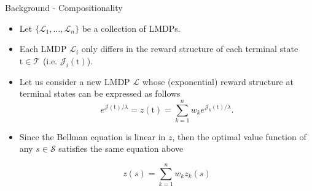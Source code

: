 \documentclass{beamer}
\theoremstyle{mystyle}
\newcommand{\tS}{\text{t}}   %
\newcommand{\cJ}{\mathcal{J}}
\newcommand{\cL}{\mathcal{L}}
\newcommand{\cS}{\mathcal{S}}
\newcommand{\cT}{\mathcal{T}}
\begin{document}
\begin{frame}{Background - Compositionality}
    \begin{itemize}
    \item Let $\{\cL_1,\ldots,\cL_n\}$ be a collection of LMDPs. 
   
    \item Each LMDP $\cL_i$ only differs in the reward structure of each terminal state $\tS\in\cT$ (i.e. $\cJ_i(\tS)$).
    
    \item Let us consider a new LMDP $\cL$ whose (exponential) reward structure at terminal states can be expressed as follows~\cite{TodorovNIPS2009} 
    \begin{equation*}
        e^{\cJ(\tS)/\lambda} = z(\tS) = \sum_{k=1}^n w_k e^{\cJ_k(\tS)/\lambda}.
    \end{equation*}
    
    \item Since the Bellman equation is linear in $z$, then the optimal value function of any $s \in \cS$ satisfies the same equation above
    
    \begin{equation*}
       z(s) =  \sum_{k=1}^n w_k z_k(s) 
    \end{equation*}
    
    \end{itemize}
    
\end{frame}
\end{document}
